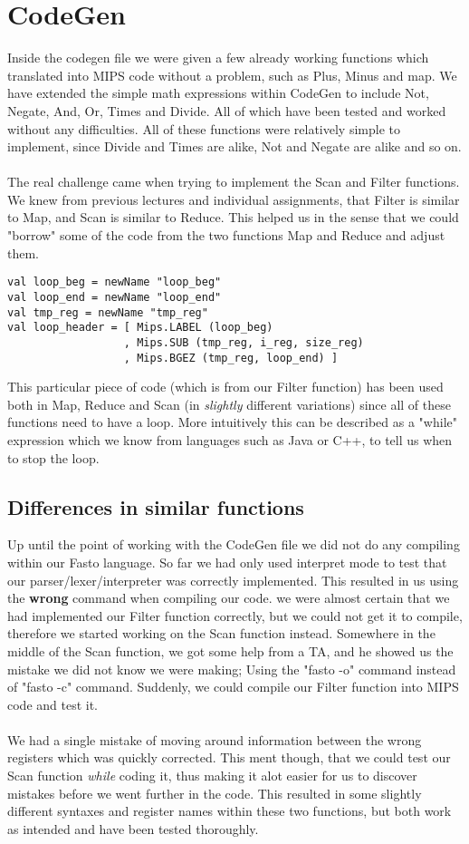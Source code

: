 \documentclass[12pt]{article}
\begin{document}
\section{CodeGen}
Inside the codegen file we were given a few already working functions which translated into MIPS code without a problem, such as Plus, Minus and map. We have extended the simple math expressions within CodeGen to include Not, Negate, And, Or, Times and Divide. All of which have been tested and worked without any difficulties. All of these functions were relatively simple to implement, since Divide and Times are alike, Not and Negate are alike and so on.\\\\
The real challenge came when trying to implement the Scan and Filter functions. We knew from previous lectures and individual assignments, that Filter is similar to Map, and Scan is similar to Reduce. This helped us in the sense that we could "borrow" some of the code from the two functions Map and Reduce and adjust them.
\begin{verbatim}
val loop_beg = newName "loop_beg"
val loop_end = newName "loop_end"
val tmp_reg = newName "tmp_reg"
val loop_header = [ Mips.LABEL (loop_beg)
                  , Mips.SUB (tmp_reg, i_reg, size_reg)
                  , Mips.BGEZ (tmp_reg, loop_end) ]
\end{verbatim}
This particular piece of code (which is from our Filter function) has been used both in Map, Reduce and Scan (in \textit{slightly} different variations) since all of these functions need to have a loop. More intuitively this can be described as a "while" expression which we know from languages such as Java or C++, to tell us when to stop the loop. 
\subsection{Differences in similar functions}
Up until the point of working with the CodeGen file we did not do any compiling within our Fasto language. So far we had only used interpret mode to test that our parser/lexer/interpreter was correctly implemented. This resulted in us using the \textbf{wrong} command when compiling our code. we were almost certain that we had implemented our Filter function correctly, but we could not get it to compile, therefore we started working on the Scan function instead. Somewhere in the middle of the Scan function, we got some help from a TA, and he showed us the mistake we did not know we were making; Using the "fasto -o" command instead of "fasto -c" command. Suddenly, we could compile our Filter function into MIPS code and test it.\\\\ 
We had a single mistake of moving around information between the wrong registers which was quickly corrected. This ment though, that we could test our Scan function \textit{while} coding it, thus making it alot easier for us to discover mistakes before we went further in the code. This resulted in some slightly different syntaxes and register names within these two functions, but both work as intended and have been tested thoroughly. 
\end{document}
